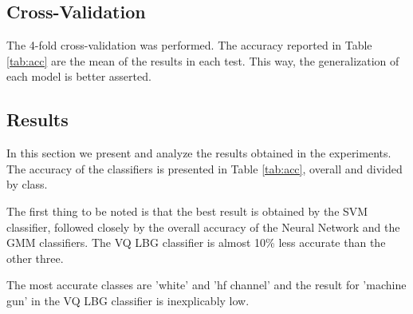 \documentclass[12pt]{article}
\begin{document}
\subsection{Cross-Validation} \label{exp:crossv}

The 4-fold cross-validation was performed. The accuracy reported in Table \ref{tab:acc} are the mean of the results in each test. This way, the generalization of each model is better asserted.

\subsection{Results} \label{exp:res}


In this section we present and analyze the results obtained in the experiments. The accuracy of the classifiers is presented in Table \ref{tab:acc}, overall and divided by class.

The first thing to be noted is that the best result is obtained by the SVM classifier, followed closely by the overall accuracy of the Neural Network and the GMM classifiers. The VQ LBG classifier is almost 10\% less accurate than the other three.

The most accurate classes are 'white' and 'hf channel' and the result for 'machine gun' in the VQ LBG classifier is inexplicably low.
\end{document}
